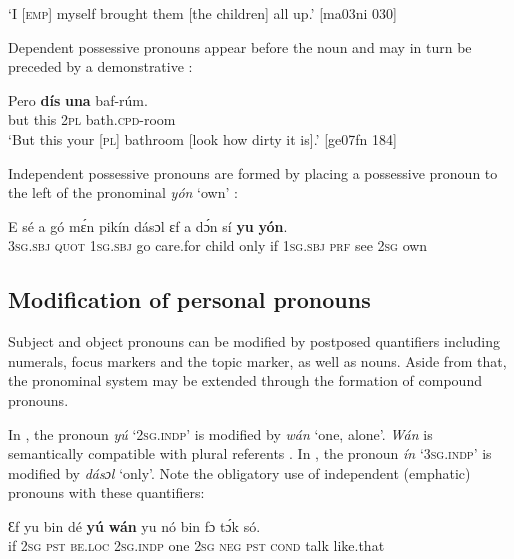 \glt ‘I \textsc{[emp]} myself brought them [the children] all up.’ [ma03ni 030]
\z

Dependent possessive pronouns appear before the noun and may in turn be preceded by a demonstrative :


\ea%
    \label{ex:key:287}
    \gll Pero    \textbf{dís}  \textbf{ una} baf-rúm.\\
but    this  \textsc{2pl}    bath.\textsc{cpd}{}-room\\

\glt ‘But this your [\textsc{pl}] bathroom [look how dirty it is].’ [ge07fn 184]
\z

Independent possessive pronouns are formed by placing a possessive pronoun to the left of the pronominal \textit{yón} ‘own’ :


\ea%
    \label{ex:key:288}
    \gll E    sé    a    gó  mɛ́n    pikín  dásɔl  ɛf  a
dɔ́n  sí  \textbf{yu} \textbf{ yón}.\\
\textsc{3sg.sbj}  \textsc{quot}  \textsc{1sg.sbj}  go  care.for  child  only    if  \textsc{1sg.sbj}
\textsc{prf}  see  \textsc{2sg}  own\\

\glt {}
\z

\subsection{Modification of personal pronouns}\label{sec:5.4.2}

Subject and object pronouns can be modified by postposed quantifiers including numerals, focus markers and the topic marker, as well as nouns. Aside from that, the pronominal system may be extended through the formation of compound pronouns.


In , the pronoun \textit{yú} ‘\textsc{2sg.indp}’ is modified by \textit{wán} ‘one, alone’. \textit{Wán} is semantically compatible with plural referents . In , the pronoun \textit{ín} ‘\textsc{3sg.indp}’ is modified by \textit{dásɔl} ‘only’. Note the obligatory use of independent (emphatic) pronouns with these quantifiers: 



\ea%
    \label{ex:key:289}
    \gll Ɛf  yu  bin  dé    \textbf{yú} \textbf{   wán}   yu  nó  bin  fɔ    tɔ́k  só.\\
if  \textsc{2sg}  \textsc{pst}  \textsc{be.loc}  \textsc{2sg.indp}  one    \textsc{2sg}  \textsc{neg}  \textsc{pst}  \textsc{cond}    talk  like.that\\

